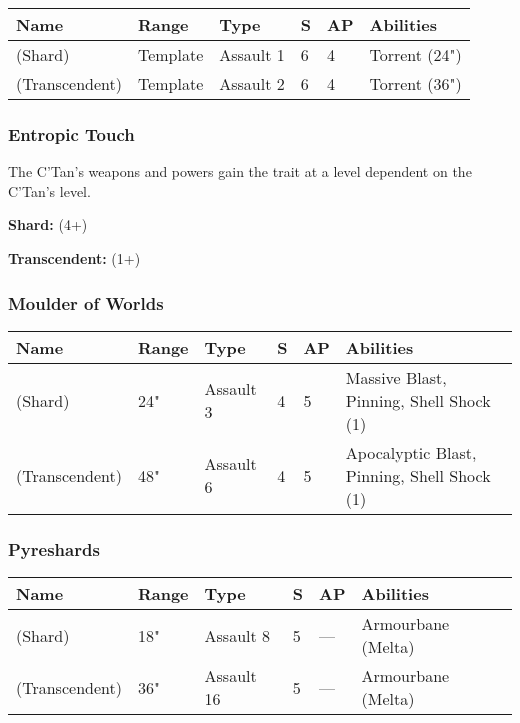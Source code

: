 \noindent
\begin{tabular}{||m{160pt} m{31pt} m{55pt} m{12pt} m{12pt} m{200pt}||}
	\hline
	Name & Range & Type & S & AP & Abilities \\
	\hline
	\quickref{Cosmic Fire} (Shard) & Template & Assault 1 & 6 & 4 & Torrent (24") \\
	\quickref{Cosmic Fire} (Transcendent) & Template & Assault 2 & 6 & 4 & Torrent (36") \\
	\hline
\end{tabular}

\subsubsection{Entropic Touch} \label{Entropic Touch}

The C'Tan's weapons and powers gain the  trait at a level dependent on the C'Tan's level.

\textbf{Shard:}  (4+)

\textbf{Transcendent:}  (1+)

\subsubsection{Moulder of Worlds} \label{Moulder of Worlds}

\noindent
\begin{tabular}{||m{160pt} m{31pt} m{55pt} m{12pt} m{12pt} m{200pt}||}
	\hline
	Name & Range & Type & S & AP & Abilities \\
	\hline
	\quickref{Moulder of Worlds} (Shard) & 24" & Assault 3 & 4 & 5 & Massive Blast, Pinning, Shell Shock (1) \\
	\quickref{Moulder of Worlds} (Transcendent) & 48" & Assault 6 & 4 & 5 & Apocalyptic Blast, Pinning, Shell Shock (1) \\
	\hline
\end{tabular}

\subsubsection{Pyreshards} \label{Pyreshards}

\noindent
\begin{tabular}{||m{160pt} m{31pt} m{55pt} m{12pt} m{12pt} m{200pt}||}
	\hline
	Name & Range & Type & S & AP & Abilities \\
	\hline
	\quickref{Pyreshards} (Shard) & 18" & Assault 8 & 5 & — & Armourbane (Melta) \\
	\quickref{Pyreshards} (Transcendent) & 36" & Assault 16 & 5 & — & Armourbane (Melta) \\
	\hline
\end{tabular}

